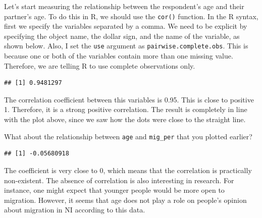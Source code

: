 \documentclass[
]{book}
\newenvironment{Shaded}{\begin{snugshade}}{\end{snugshade}}
\newcommand{\AttributeTok}[1]{\textcolor[rgb]{0.13,0.29,0.53}{#1}}
\newcommand{\FunctionTok}[1]{\textcolor[rgb]{0.13,0.29,0.53}{\textbf{#1}}}
\newcommand{\NormalTok}[1]{#1}
\newcommand{\SpecialCharTok}[1]{\textcolor[rgb]{0.81,0.36,0.00}{\textbf{#1}}}
\newcommand{\StringTok}[1]{\textcolor[rgb]{0.31,0.60,0.02}{#1}}
\begin{document}
Let's start measuring the relationship between the respondent's age and their partner's age. To do this in R, we should use the \texttt{cor()} function. In the R syntax, first we specify the variables separated by a comma. We need to be explicit by specifying the object name, the dollar sign, and the name of the variable, as shown below. Also, I set the \texttt{use} argument as \texttt{\textquotesingle{}pairwise.complete.obs\textquotesingle{}}. This is because one or both of the variables contain more than one missing value. Therefore, we are telling R to use complete observations only.

\begin{Shaded}
\end{Shaded}

\begin{verbatim}
## [1] 0.9481297
\end{verbatim}

The correlation coefficient between this variables is 0.95. This is close to positive 1. Therefore, it is a strong positive correlation. The result is completely in line with the plot above, since we saw how the dots were close to the straight line.

What about the relationship between \texttt{age} and \texttt{mig\_per} that you plotted earlier?

\begin{Shaded}
\end{Shaded}

\begin{verbatim}
## [1] -0.05680918
\end{verbatim}

The coefficient is very close to 0, which means that the correlation is practically non-existent. The absence of correlation is also interesting in research. For instance, one might expect that younger people would be more open to migration. However, it seems that age does not play a role on people's opinion about migration in NI according to this data.
\end{document}
